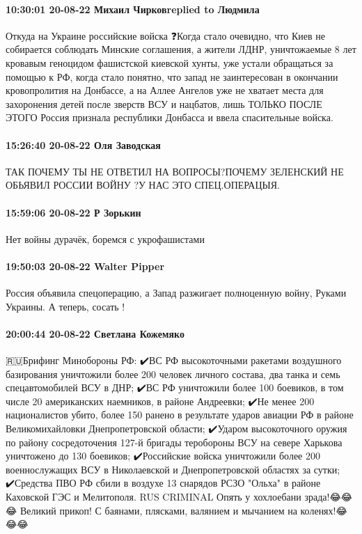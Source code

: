 \paragraph{10:30:01 20-08-22 Михаил Чирковreplied to Людмила}

Откуда на Украине российские войска ❓Когда стало очевидно, что Киев не
собирается соблюдать Минские соглашения, а жители ЛДНР, уничтожаемые 8 лет
кровавым геноцидом фашистской киевской хунты, уже устали обращаться за помощью
к РФ, когда стало понятно, что запад не заинтересован в окончании кровопролития
на Донбассе, а на Аллее Ангелов уже не хватает места для захоронения детей
после зверств ВСУ и нацбатов, лишь ТОЛЬКО ПОСЛЕ ЭТОГО Россия признала
республики Донбасса и ввела спасительные войска.

\paragraph{15:26:40 20-08-22 Оля Заводская}

ТАК ПОЧЕМУ ТЫ НЕ ОТВЕТИЛ НА ВОПРОСЫ?ПОЧЕМУ ЗЕЛЕНСКИЙ НЕ ОБЬЯВИЛ РОССИИ ВОЙНУ ?У
НАС ЭТО СПЕЦ.ОПЕРАЦЫЯ.

\paragraph{15:59:06 20-08-22 Р Зорькин}

Нет войны дурачёк, боремся с укрофашистами


\paragraph{19:50:03 20-08-22 Walter Pipper}

Россия объявила спецоперацию, а Запад разжигает полноценную войну, Руками
Украины. А теперь, сосать !

\paragraph{20:00:44 20-08-22 Светлана Кожемяко}

🇷🇺Брифинг Минобороны РФ:
✔️ВС РФ высокоточными ракетами воздушного базирования уничтожили более 200 человек личного состава, два танка и семь спецавтомобилей ВСУ в ДНР;
✔️ВС РФ уничтожили более 100 боевиков, в том числе 20 американских наемников, в районе Андреевки;
✔️Не менее 200 националистов убито, более 150 ранено в результате ударов авиации РФ в районе Великомихайловки Днепропетровской области;
✔️Ударом высокоточного оружия по району сосредоточения 127-й бригады теробороны ВСУ на севере Харькова уничтожено до 130 боевиков;
✔️Российские войска уничтожили более 200 военнослужащих ВСУ в Николаевской и Днепропетровской областях за сутки;
✔️Средства ПВО РФ сбили в воздухе 13 снарядов РСЗО "Ольха" в районе Каховской ГЭС и Мелитополя.
RUS CRIMINAL Опять у хохлоебани зрада!😂😂😂 Великий прикоп! С баянами, плясками, валянием и мычанием на коленях!😂😂😂

